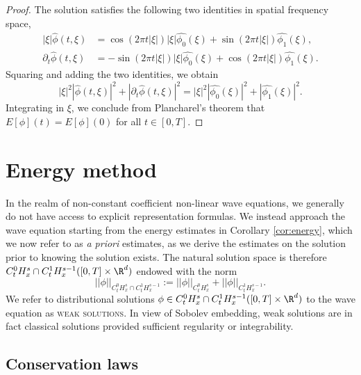 \documentclass[reqno]{amsart}
\theoremstyle{definition}
\theoremstyle{remark}
\renewcommand{\emph}{\textsc}
\begin{document}
\begin{proof}
	The solution satisfies the following two identities in spatial frequency space, 
\begin{align*}
	|\xi| \widehat \phi (t, \xi)
		&= \cos(2\pi t |\xi|) |\xi| \widehat{\phi_0} (\xi) + \sin(2\pi t |\xi|) \widehat{\phi_1} (\xi), \\
	\partial_t \widehat \phi(t, \xi)
		&= - \sin(2\pi t |\xi|) |\xi| \widehat{\phi_0} (\xi) + \cos (2\pi t |\xi|) \widehat{\phi_1} (\xi). 	
\end{align*}
	Squaring and adding the two identities, we obtain 
		\[ |\xi|^2 |\widehat \phi (t, \xi)|^2 + |\partial_t \widehat\phi (t, \xi)|^2 = |\xi|^2 |\widehat{\phi_0} (\xi)|^2 + |\widehat{\phi_1} (\xi)|^2. \]
	Integrating in $\xi$, we conclude from Plancharel's theorem that $E[\phi](t) = E[\phi] (0)$ for all $t \in [0, T]$. 
\end{proof}

\section{Energy method}

In the realm of non-constant coefficient non-linear wave equations, we generally do not have access to explicit representation formulas. We instead approach the wave equation starting from the energy estimates in Corollary \ref{cor:energy}, which we now refer to as \textit{a priori} estimates, as we derive the estimates on the solution prior to knowing the solution exists. The natural solution space is therefore $C^0_t H^s_x \cap C^1_t H^{s - 1}_x ([0, T] \times \R^d)$ endowed with the norm 
	\[ ||\phi||_{C^0_t H^s_x \cap C^1_t H^{s - 1}_x} := ||\phi||_{C^0_t H^s_x} + ||\phi||_{C^1_t H^{s - 1}_x}. \]	
We refer to distributional solutions $\phi \in C^0_t H^s_x \cap C^1_t H^{s - 1}_x ([0, T] \times \R^d)$ to the wave equation as \emph{weak solutions}. In view of Sobolev embedding, weak solutions are in fact classical solutions provided sufficient regularity or integrability.


\subsection{Conservation laws}
\end{document}
